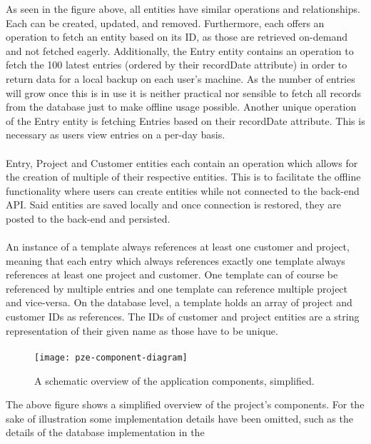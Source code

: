 As seen in the figure above, all entities have similar operations and relationships. 
Each can be created, updated, and removed.
Furthermore, each offers an operation to fetch an entity based on its ID, as those are retrieved on-demand and not 
fetched eagerly.
Additionally, the Entry entity contains an operation to fetch the 100 latest entries (ordered by their recordDate attribute) in
order to return data for a local backup on each user's machine.
As the number of entries will grow once this is in use it is neither practical nor sensible to fetch all records from the database
just to make offline usage possible. 
Another unique operation of the Entry entity is fetching Entries based on their recordDate attribute. 
This is necessary as users view entries on a per-day basis.\paragraph{}
Entry, Project and Customer entities each contain an operation which allows for the creation of multiple of their respective entities.
This is to facilitate the offline functionality where users can create entities while not connected to the back-end API. 
Said entities are saved locally and once connection is restored, they are posted to the back-end and persisted.\paragraph{}
An instance of a template always references at least one customer and project, meaning that each entry which always references exactly one template 
always references at least one project and customer. 
One template can of course be referenced by multiple entries and one template can reference multiple project and vice-versa.
On the database level, a template holds an array of project and customer IDs as references.
The IDs of customer and project entities are a string representation of their given name as those have to be unique.\paragraph{}
\begin{figure}[H]
  \centering
  \texttt{[image: pze-component-diagram]}
  \caption{A schematic overview of the application components, simplified.}
  \label{fig:pze-component-diagram}
\end{figure}
The above figure shows a simplified overview of the project's components. 
For the sake of illustration some implementation details have been omitted, such as the details of the database implementation in the 
